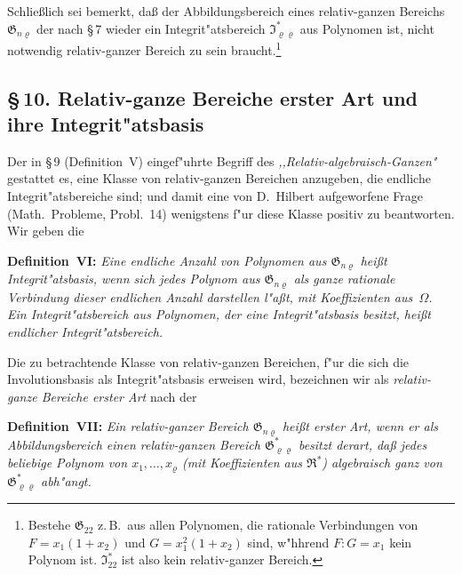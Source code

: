 \documentclass[11pt,a4paper]{article}
\begin{document}
Schlie\ss{}lich sei bemerkt, da\ss{} der Abbildungsbereich eines relativ-ganzen
Bereichs $\mathfrak{G}_{n\varrho}$ der nach \S\,7 wieder ein Integrit"{a}tsbereich $\mathfrak{I}_{\varrho\varrho}^{*}$ aus Polynomen ist,
nicht notwendig relativ-ganzer Bereich zu sein braucht.\footnote{Bestehe $\mathfrak{G}_{22}$
z.\,B.\ aus allen Polynomen, die rationale Verbindungen von $F=x_{1}(1+x_{2})$
und $G=x_{1}^{2}(1+x_{2})$ sind, w"{h}hrend $F:G=x_{1}$ kein Polynom ist. $\mathfrak{I}_{22}^{*}$ ist also
kein relativ-ganzer Bereich.}

\subsection*{\S\,10. Relativ-ganze Bereiche erster Art und ihre Integrit"{a}tsbasis}

Der in \S\,9 (Definition~V) eingef"{u}hrte Begriff des \emph{,,Relativ-algebraisch-Ganzen"{}}
gestattet es, eine Klasse von relativ-ganzen Bereichen anzugeben, die endliche
Integrit"{a}tsbereiche sind; und damit eine von D.~Hilbert aufgeworfene Frage
(Math.\ Probleme, Probl.\ 14) wenigstens f"{u}r diese Klasse positiv zu beantworten.
Wir geben die

\medskip
\noindent
\textbf{Definition~VI:} \emph{Eine endliche Anzahl von Polynomen aus $\mathfrak{G}_{n\varrho}$
hei\ss{}t \emph{Integrit"{a}tsbasis}, wenn sich jedes Polynom aus $\mathfrak{G}_{n\varrho}$ als ganze rationale
Verbindung dieser endlichen Anzahl darstellen l"{a}\ss{}t, mit Koeffizienten aus~$\Omega$.
Ein Integrit"{a}tsbereich aus Polynomen, der eine Integrit"{a}tsbasis besitzt, hei\ss{}t
\emph{endlicher} Integrit"{a}tsbereich.}

\smallskip
Die zu betrachtende Klasse von relativ-ganzen Bereichen, f"{u}r die sich
die Involutionsbasis als Integrit"{a}tsbasis erweisen wird, bezeichnen wir als
\emph{relativ-ganze Bereiche erster Art} nach der

\medskip
\noindent
\textbf{Definition~VII:} \emph{Ein relativ-ganzer Bereich $\mathfrak{G}_{n\varrho}$ hei\ss{}t \emph{erster Art},
wenn er als Abbildungsbereich einen relativ-ganzen Bereich $\mathfrak{G}_{\varrho\varrho}^{*}$ besitzt derart,
da\ss{} jedes beliebige Polynom von $x_{1},\dots,x_{\varrho}$ (mit Koeffizienten aus $\mathfrak{R}^{*}$)
algebraisch ganz von $\mathfrak{G}_{\varrho\varrho}^{*}$ abh"{a}ngt.}
\end{document}
